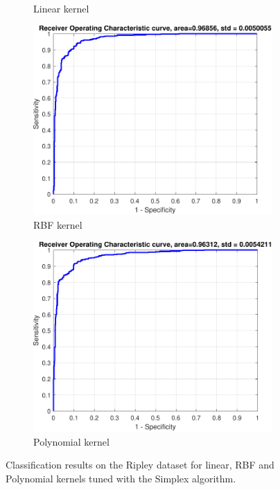 \documentclass{article}
\begin{document}
\begin{figure}[h]
\begin{subfigure}[b]{0.3\textwidth}
                    \caption{Linear kernel}
                     \label{fig:ripley_linear_roc}
                 \end{subfigure}
                 \hfill
                 \begin{subfigure}[b]{0.3\textwidth}
                     \centering
                     \includegraphics[width=\textwidth]{Assignment 1/figures/ripley_simplex_rbf_classifier_roc.pdf}
                    \caption{RBF kernel}
                     \label{fig:ripley_rbf_roc}
                 \end{subfigure}
                 \hfill
                 \begin{subfigure}[b]{0.3\textwidth}
                     \centering
                     \includegraphics[width=\textwidth]{Assignment 1/figures/ripley_simplex_polynomial_classifier_roc.pdf}
                    \caption{Polynomial kernel}
                     \label{fig:ripley_poly_roc}
                 \end{subfigure}
                \caption{Classification results on the Ripley dataset for linear, RBF and Polynomial kernels tuned with the Simplex algorithm.}
            \end{figure}
        
\end{document}
